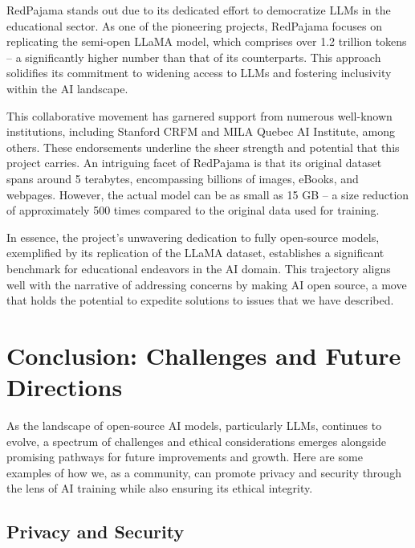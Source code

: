 \documentclass[
]{book}
\begin{document}
RedPajama stands out due to its dedicated effort to democratize LLMs in the educational sector. As one of the pioneering projects, RedPajama focuses on replicating the semi-open LLaMA model, which comprises over 1.2 trillion tokens -- a significantly higher number than that of its counterparts. This approach solidifies its commitment to widening access to LLMs and fostering inclusivity within the AI landscape.

This collaborative movement has garnered support from numerous well-known institutions, including Stanford CRFM and MILA Quebec AI Institute, among others. These endorsements underline the sheer strength and potential that this project carries. An intriguing facet of RedPajama is that its original dataset spans around 5 terabytes, encompassing billions of images, eBooks, and webpages. However, the actual model can be as small as 15 GB -- a size reduction of approximately 500 times compared to the original data used for training.

In essence, the project's unwavering dedication to fully open-source models, exemplified by its replication of the LLaMA dataset, establishes a significant benchmark for educational endeavors in the AI domain. This trajectory aligns well with the narrative of addressing concerns by making AI open source, a move that holds the potential to expedite solutions to issues that we have described.

\hypertarget{conclusion-challenges-and-future-directions}{%
\chapter{Conclusion: Challenges and Future Directions}\label{conclusion-challenges-and-future-directions}}

As the landscape of open-source AI models, particularly LLMs, continues to evolve, a spectrum of challenges and ethical considerations emerges alongside promising pathways for future improvements and growth. Here are some examples of how we, as a community, can promote privacy and security through the lens of AI training while also ensuring its ethical integrity.

\hypertarget{privacy-and-security}{%
\section{Privacy and Security}\label{privacy-and-security}}
\end{document}
